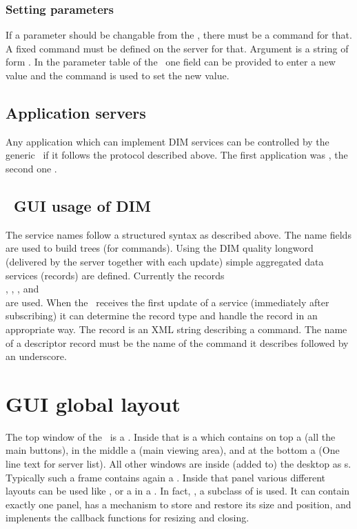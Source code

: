 \subsubsection{Setting parameters}
If a parameter should be changable from the \gui, there must be a command for that. A fixed command  must be defined on the server for that. 
Argument is a string of form . In the parameter table of the \gui\ one field can be provided to enter a new value and the command  is used to set the new value.
\subsection{Application servers}
Any application which can implement DIM services can be controlled by the generic \gui\ if it follows the protocol described above. The first application was \dabc, the second one \mbs.
\subsection{\dabc\ GUI usage of DIM}
The service names follow a structured syntax as described above. The name fields are used to
build trees (for commands). Using the DIM quality longword (delivered by the server together
with each update) simple aggregated data services (records) are defined.
Currently the records \\
, , ,  and \\
are used. When the \gui\ receives the first update of a service (immediately after subscribing)
it can determine the record type and handle the record in an appropriate way.
The  record is an XML string describing a command.
The name of a descriptor record must be the name of the command it describes followed by an underscore.
\section{GUI global layout}
The top window of the \gui\ is a . Inside that is a 
which contains on top a  (all the main buttons), 
in the middle a  (main viewing area), and at the bottom
a  (One line text for server list). 
All other windows are inside (added to) the desktop as s.
Typically such a frame contains again a . Inside that panel various
different layouts can be used like , or a  in a .
In fact, , a subclass of  is used.
It can contain exactly one panel, has a mechanism to store and restore its size and position,
and implenents the callback functions for resizing and closing.

